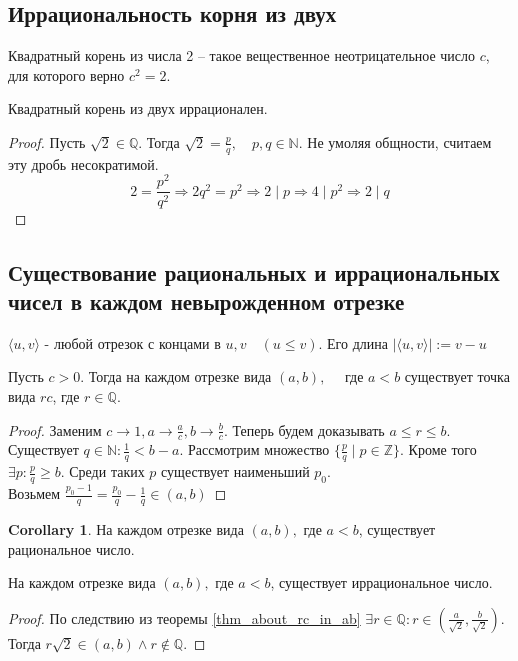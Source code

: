 \documentclass[11pt]{book}
\newcommand{\Z}{\mathbb{Z}}
\newcommand{\N}{\mathbb{N}}
\newcommand{\Q}{\mathbb{Q}}
\renewcommand{\le}{\leqslant}
\renewcommand{\ge}{\geqslant}
\theoremstyle{definition}
\theoremstyle{plain}
\theoremstyle{plain}
\theoremstyle{definition}
\newtheorem*{cor}{Corollary}
\theoremstyle{remark}
\begin{document}
\subsection{Иррациональность корня из двух}\label{ques_5}
\begin{defn}
    Квадратный корень из числа 2 -- такое вещественное неотрицательное число $c$, для которого верно $c^2 = 2$.
\end{defn}
\begin{thm}
    Квадратный корень из двух иррационален.
\end{thm}
\begin{proof}
    Пусть $\sqrt{2} \in  \Q$. Тогда $ \sqrt{2} = \frac{p}{q}, \quad p, q \in \N$. Не умоляя общности, считаем эту дробь несократимой. \\
    $$2 = \frac{p^2}{q^2} \Rightarrow 2 q^2 = p^2 \Rightarrow 2 \mid p \Rightarrow 4 \mid p^2 \Rightarrow 2 \mid q$$
\end{proof}
\subsection{Существование рациональных и иррациональных чисел в каждом невырожденном отрезке}\label{ques_6}
\begin{defn}
    $\langle u, v \rangle $ - любой отрезок с концами в $u, v\quad (u \le v)$. Его длина $|\langle u, v \rangle | := v-u$
\end{defn}
\begin{thm}\label{thm_about_rc_in_ab}
    Пусть $c > 0$. Тогда на каждом отрезке вида $(a, b), \quad \mbox{ где } a < b$ существует точка вида $rc$, где  $r \in \Q$.
\end{thm}
\begin{proof}
    Заменим $c \to 1, a \to \frac{a}{c} , b \to \frac{b}{c}$. Теперь будем доказывать ${a}\le r \le {b}$.
    Существует $q \in \N: \frac{1}{q}<b-a$. Рассмотрим множество $\{\frac{p}{q}\mid p \in \Z\}$. Кроме того $ \exists p: \frac{p}{q} \ge b$. Среди таких $p$ существует наименьший $p_0$.\\
    Возьмем $\frac{p_0-1}{q} = \frac{p_0}{q} - \frac{1}{q} \in ( a, b )$
\end{proof}
\begin{cor}
    На каждом отрезке вида $(a, b),  \mbox{ где } a < b$, существует рациональное число.
\end{cor}
\begin{thm}
    На каждом отрезке вида $(a, b),  \mbox{ где } a < b$, существует иррациональное число.
\end{thm}
\begin{proof}
    По следствию из теоремы \ref{thm_about_rc_in_ab} $\exists r \in  \Q: r \in \left ( \frac{a}{\sqrt{2}}, \frac{b}{\sqrt{2}} \right )$. Тогда $r \sqrt{2} \in (a, b) \wedge r \notin \Q$.
\end{proof}
\end{document}
